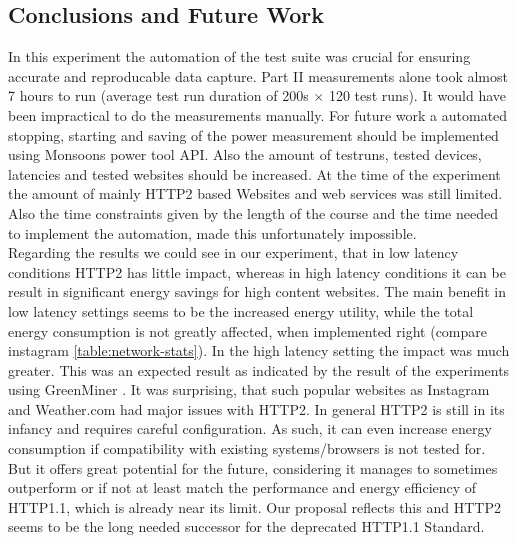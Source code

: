 \documentclass{article}
\begin{document}
\subsection{Conclusions and Future Work}
\label{chapter:conclusions}
In this experiment the automation of the test suite was crucial for ensuring accurate and reproducable data capture. Part II measurements alone took almost 7 hours to run (average test run duration of 200s $\times$ 120 test runs). It would have been impractical to do the measurements manually. For future work a automated stopping, starting and saving of the power measurement should be implemented using Monsoons power tool API. Also the amount of testruns, tested devices, latencies and tested websites should be increased. At the time of the experiment the amount of mainly HTTP2 based Websites and web services was still limited. Also the time constraints given by the length of the course and the time needed to implement the automation, made this unfortunately impossible. \\

Regarding the results we could see in our experiment, that in low latency conditions HTTP2 has little impact, whereas in high latency conditions it can be result in significant energy savings for high content websites. The main benefit in low latency settings seems to be the increased energy utility, while the total energy consumption is not greatly affected, when implemented right (compare instagram \ref{table:network-stats}). In the high latency setting the impact was much greater. This was an expected result as indicated by the result of the  experiments using GreenMiner \citep{greenminer}. It was surprising, that such popular websites as Instagram and Weather.com had major issues with HTTP2. In general HTTP2 is still in its infancy and requires careful configuration. As such, it can even increase energy consumption if compatibility with existing systems/browsers is not tested for. But it offers great potential for the future, considering it manages to sometimes outperform or if not at least match the performance and energy efficiency of HTTP1.1, which is already near its limit. Our proposal reflects this and HTTP2 seems to be the long needed successor for the deprecated HTTP1.1 Standard.



\end{document}
